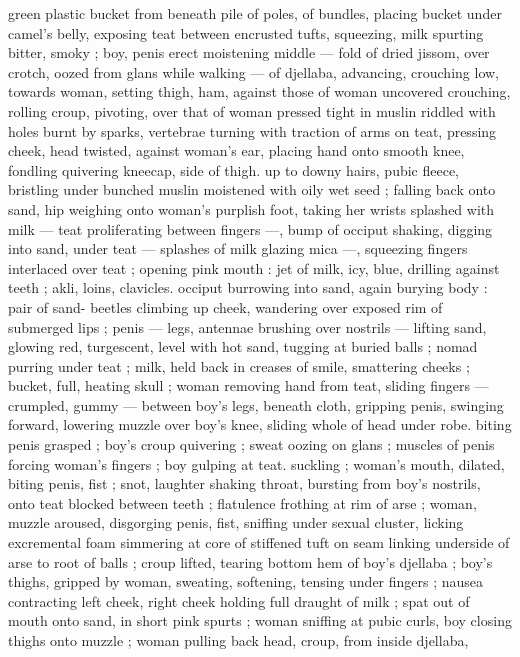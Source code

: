 green plastic bucket from beneath pile of poles, of bundles, placing
bucket under camel's belly, exposing teat between encrusted tufts,
squeezing, milk spurting bitter, smoky ; boy, penis erect moistening
middle --- fold of dried jissom, over crotch, oozed from glans while
walking --- of djellaba, advancing, crouching low, towards woman,
setting thigh, ham, against those of woman uncovered crouching,
rolling croup, pivoting, over that of woman pressed tight in muslin
riddled with holes burnt by sparks, vertebrae turning with traction of
arms on teat, pressing cheek, head twisted, against woman's ear,
placing hand onto smooth knee, fondling quivering kneecap, side of
thigh. up to downy hairs, pubic fleece, bristling under bunched
muslin moistened with oily wet seed ; falling back onto sand, hip
weighing onto woman's purplish foot, taking her wrists splashed with
milk --- teat proliferating between fingers ---, bump of occiput
shaking, digging into sand, under teat --- splashes of milk glazing
mica ---, squeezing fingers interlaced over teat ; opening pink mouth
: jet of milk, icy, blue, drilling against teeth ; akli, loins, clavicles.
occiput burrowing into sand, again burying body : pair of sand-
beetles climbing up cheek, wandering over exposed rim of
submerged lips ; penis --- legs, antennae brushing over nostrils ---
lifting sand, glowing red, turgescent, level with hot sand, tugging at
buried balls ; nomad purring under teat ; milk, held back in creases
of smile, smattering cheeks ; bucket, full, heating skull ; woman
removing hand from teat, sliding fingers --- crumpled, gummy ---
between boy's legs, beneath cloth, gripping penis, swinging forward,
lowering muzzle over boy's knee, sliding whole of head under robe.
biting penis grasped ; boy's croup quivering ; sweat oozing on glans
; muscles of penis forcing woman's fingers ; boy gulping at teat.
suckling ; woman's mouth, dilated, biting penis, fist ; snot, laughter
shaking throat, bursting from boy's nostrils, onto teat blocked
between teeth ; flatulence frothing at rim of arse ; woman, muzzle
aroused, disgorging penis, fist, sniffing under sexual cluster, licking
excremental foam simmering at core of stiffened tuft on seam linking
underside of arse to root of balls ; croup lifted, tearing bottom hem
of boy's djellaba ; boy's thighs, gripped by woman, sweating,
softening, tensing under fingers ; nausea contracting left cheek, right
cheek holding full draught of milk ; spat out of mouth onto sand, in
short pink spurts ; woman sniffing at pubic curls, boy closing thighs
onto muzzle ; woman pulling back head, croup, from inside djellaba,
